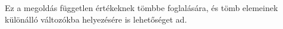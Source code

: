\begin{frame}
  Ez a megoldás független értékeknek tömbbe foglalására, és tömb elemeinek különálló változókba helyezésére is lehetőséget ad.
  \begin{exampleblock}{}
    
  \end{exampleblock}
\end{frame}
